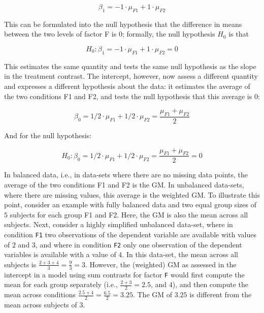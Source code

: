 \documentclass[12pt,]{krantz}
\theoremstyle{definition}
\theoremstyle{definition}
\theoremstyle{definition}
\theoremstyle{remark}
\begin{document}
\begin{equation}
\beta_1 = -1 \cdot \mu_{F1} + 1 \cdot \mu_{F2}
\end{equation}

\noindent
This can be formulated into the null hypothesis that the difference in
means between the two levels of factor F is 0; formally, the null
hypothesis \(H_0\) is that

\begin{equation}
H_0: \beta_1 = -1 \cdot \mu_{F1} + 1 \cdot \mu_{F2} = 0
\end{equation}

\noindent
This estimates the same quantity and tests the same null hypothesis as
the slope in the treatment contrast. The intercept, however, now assess
a different quantity and expresses a different hypothesis about the
data: it estimates the average of the two conditions F1 and F2, and
tests the null hypothesis that this average is 0:

\begin{equation}
\beta_0 = 1/2 \cdot \mu_{F1} + 1/2 \cdot \mu_{F2} = \frac{\mu_{F1} + \mu_{F2}}{2}
\end{equation}

And for the null hypothesis:

\begin{equation}
H_0: \beta_0 = 1/2 \cdot \mu_{F1} + 1/2 \cdot \mu_{F2} = \frac{\mu_{F1} + \mu_{F2}}{2} = 0
\end{equation}

\noindent
In balanced data, i.e., in data-sets where there are no missing data
points, the average of the two conditions F1 and F2 is the GM. In
unbalanced data-sets, where there are missing values, this average is
the weighted GM. To illustrate this point, consider an example with
fully balanced data and two equal group sizes of \(5\) subjects for each
group F1 and F2. Here, the GM is also the mean across all subjects.
Next, consider a highly simplified unbalanced data-set, where in
condition \texttt{F1} two observations of the dependent variable are
available with values of \(2\) and \(3\), and where in condition
\texttt{F2} only one observation of the dependent variables is available
with a value of \(4\). In this data-set, the mean across all subjects is
\(\frac{2 + 3 + 4}{3} = \frac{9}{3} = 3\). However, the (weighted) GM as
assessed in the intercept in a model using sum contrasts for factor
\texttt{F} would first compute the mean for each group separately (i.e.,
\(\frac{2 + 3}{2} = 2.5\), and \(4\)), and then compute the mean across
conditions \(\frac{2.5 + 4}{2} = \frac{6.5}{2} = 3.25\). The GM of
\(3.25\) is different from the mean across subjects of \(3\).
\end{document}
